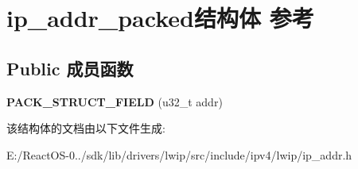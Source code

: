 \hypertarget{structip__addr__packed}{}\section{ip\+\_\+addr\+\_\+packed结构体 参考}
\label{structip__addr__packed}
\subsection*{Public 成员函数}
\begin{DoxyCompactItemize}
\item 
\mbox{\label{structip__addr__packed_ad9a337a45101464bb2e6e54c5b0292de}} 
{\bfseries P\+A\+C\+K\+\_\+\+S\+T\+R\+U\+C\+T\+\_\+\+F\+I\+E\+LD} (u32\+\_\+t addr)
\end{DoxyCompactItemize}


该结构体的文档由以下文件生成\+:\begin{DoxyCompactItemize}
\item 
E\+:/\+React\+O\+S-\/0../sdk/lib/drivers/lwip/src/include/ipv4/lwip/ip\+\_\+addr.\+h\end{DoxyCompactItemize}
